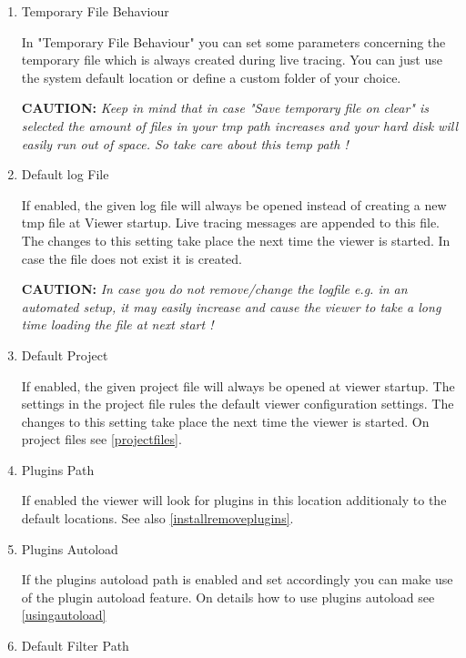 \documentclass[a4paper,11pt]{article}
\newcommand{\caution}[1]{\begin{ibox} \textbf{CAUTION:} \emph{#1} \end{ibox}}
\begin{document}
\begin{enumerate}
\item{Temporary File Behaviour}

\label{temporaryfile}
In "Temporary File Behaviour" you can set some parameters concerning the temporary file
which is always created during live tracing.
You can just use the system default location or define a custom folder of your choice.

\caution{Keep in mind that in case "Save temporary file on clear" is selected the amount of files in your tmp path increases
and your hard disk will easily run out of space. So take care about this temp path !}

\item{Default log File}

If enabled, the given log file will always be opened instead of creating a new tmp file at Viewer startup.
Live tracing messages are appended to this file.
The changes to this setting take place the next time the viewer is started. In case the file does not exist it is created.

\caution{In case you do not remove/change the logfile e.g. in an automated setup, it may easily increase and cause the viewer to take a long time loading the file
at next start !}

\item{Default Project}

\label{defaultproject}
If enabled, the given project file will always be opened at viewer startup. The settings in the project file rules
the default viewer configuration settings.
The changes to this setting take place the next time the viewer is started.
On project files see \autoref{projectfiles}.


\item{Plugins Path}

\label{pluginspath}
If enabled the viewer will look for plugins in this location additionaly to the default locations.
See also \autoref{installremoveplugins}.

\item{Plugins Autoload}

\label{enableautoload}
If the plugins autoload path is enabled and set accordingly you can make use of the plugin autoload feature.
\linebreak
On details how to use plugins autoload see \autoref{usingautoload}

\item{Default Filter Path}


\end{enumerate}
\end{document}
